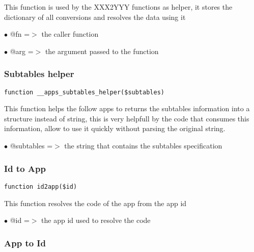 \documentclass[a4paper]{article}
\begin{document}
This function is used by the XXX2YYY functions as helper, it stores the
dictionary of all conversions and resolves the data using it

\begin{compactitem}
\item[\color{myblue}$\bullet$] @fn  =$>$ the caller function
\item[\color{myblue}$\bullet$] @arg =$>$ the argument passed to the function
\end{compactitem}

\hypertarget{toc17}{}
\subsubsection{Subtables helper}

\begin{lstlisting}
function __apps_subtables_helper($subtables)
\end{lstlisting}

This function helps the follow apps to returns the subtables information into
a structure instead of string, this is very helpfull by the code that consumes
this information, allow to use it quickly without parsing the original string.

\begin{compactitem}
\item[\color{myblue}$\bullet$] @subtables =$>$ the string that contains the subtables specification
\end{compactitem}

\hypertarget{toc18}{}
\subsubsection{Id to App}

\begin{lstlisting}
function id2app($id)
\end{lstlisting}

This function resolves the code of the app from the app id

\begin{compactitem}
\item[\color{myblue}$\bullet$] @id =$>$ the app id used to resolve the code
\end{compactitem}

\hypertarget{toc19}{}
\subsubsection{App to Id}
\end{document}
